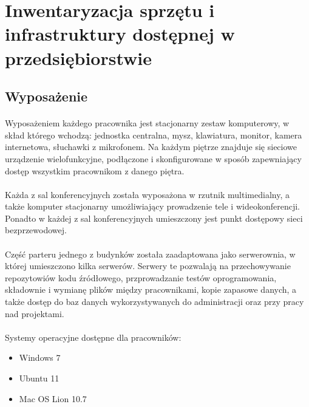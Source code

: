 \section{Inwentaryzacja sprzętu i infrastruktury dostępnej w przedsiębiorstwie}

\subsection{Wyposażenie}
\paragraph{}
Wyposażeniem każdego pracownika jest stacjonarny zestaw komputerowy, w skład którego wchodzą: jednostka centralna, mysz, klawiatura, monitor, kamera internetowa, słuchawki z mikrofonem.
Na każdym piętrze znajduje się sieciowe urządzenie wielofunkcyjne, podłączone i skonfigurowane w sposób zapewniający dostęp wszystkim pracownikom z danego piętra.

\paragraph{}
Każda z sal konferencyjnych została wyposażona w rzutnik multimedialny, a także komputer stacjonarny umożliwiający prowadzenie tele i wideokonferencji.
Ponadto w każdej z sal konferencyjnych umieszczony jest punkt dostępowy sieci bezprzewodowej.

\paragraph{}
Część parteru jednego z budynków została zaadaptowana jako serwerownia, w której umieszczono kilka serwerów. Serwery te pozwalają na przechowywanie repozytowiów kodu źródłowego, przprowadzanie testów oprogramowania, składownie i wymianę plików między pracownikami, kopie zapasowe danych, a także dostęp do baz danych wykorzystywanych do administracji oraz przy pracy nad projektami.

\paragraph{}
Systemy operacyjne dostępne dla pracowników:
\begin{itemize}
  \item Windows 7
  \item Ubuntu 11
  \item Mac OS Lion 10.7
\end{itemize}

